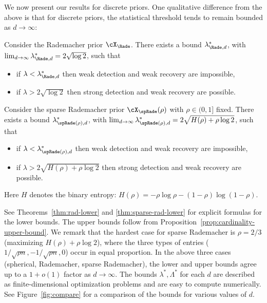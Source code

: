 \documentclass{article}
\begin{document}
We now present our results for discrete priors. One qualitative difference from the above is that for discrete priors, the statistical threshold tends to remain bounded as $d \to \infty$:

\begin{theorem}\label{thm:dinf-rademacher}
Consider the Rademacher prior $\cX_\Rade$. There exists a bound $\lambda^*_{\Rade,d}$, with $\lim_{d \to \infty} \lambda^*_{\Rade,d} = 2 \sqrt{\log 2}$, such that
\begin{itemize}
    \item if $\lambda < \lambda^*_{\mathrm{\Rade},d}$ then
    weak detection and weak recovery are impossible,
    \item if $\lambda > 2\sqrt{\log 2}$ then
    strong detection and weak recovery are possible.
\end{itemize}
\end{theorem}

\begin{theorem}\label{thm:dinf-sparse-rademacher}
Consider the sparse Rademacher prior $\cX_\spRade(\rho)$ with $\rho \in (0,1]$ fixed. There exists a bound $\lambda^*_{\spRade(\rho),d}$, with $\lim_{d \to \infty} \lambda^*_{\spRade(\rho),d} = 2 \sqrt{H(\rho) + \rho \log 2}$, such that
\begin{itemize}
    \item if $\lambda < \lambda^*_{\spRade(\rho),d}$ then
    weak detection and weak recovery are impossible,
    \item if $\lambda > 2\sqrt{H(\rho) + \rho \log 2}$ then
    strong detection and weak recovery are possible.
\end{itemize}
Here $H$ denotes the binary entropy: $H(\rho) = -\rho \log \rho - (1-\rho)\log(1-\rho)$.
\end{theorem}

\noindent See Theorems~\ref{thm:rad-lower} and \ref{thm:sparse-rad-lower} for explicit formulas for the lower bounds. The upper bounds follow from Proposition~\ref{prop:cardinality-upper-bound}. We remark that the hardest case for sparse Rademacher is $\rho = 2/3$ (maximizing $H(\rho) + \rho \log 2$), where the three types of entries ($1/\sqrt{\rho n}, -1/\sqrt{\rho n}, 0$) occur in equal proportion. In the above three cases (spherical, Rademacher, sparse Rademacher), the lower and upper bounds agree up to a $1+o(1)$ factor as $d \to \infty$. The bounds $\lambda^*,\Lambda^*$ for each $d$ are described as finite-dimensional optimization problems and are easy to compute numerically. See Figure~\ref{fig:compare} for a comparison of the bounds for various values of $d$.
\end{document}
